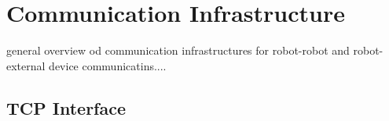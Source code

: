 \section{Communication Infrastructure}

general overview od communication infrastructures for robot-robot and robot-external device communicatins....


\subsection{TCP Interface}







